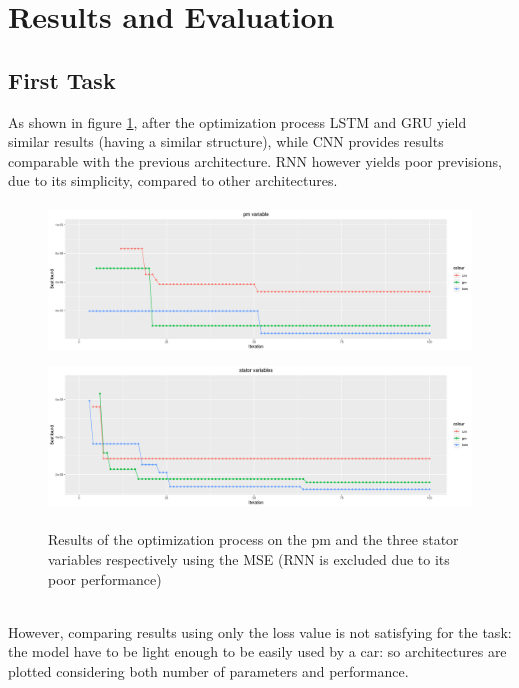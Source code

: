 \section{Results and Evaluation}
 
\subsection{First Task}
As shown in figure \ref{fig:automl_mse}, after the optimization process LSTM and GRU yield similar results (having a similar structure), while CNN provides results comparable with the previous architecture.
RNN however yields poor previsions, due to its simplicity, compared to other architectures.
\begin{figure}[!h]
    \centering
    \includegraphics[width=\linewidth, height=4cm]{imgs/comparison_MSE.png}
    \includegraphics[width=\linewidth, height=4cm]{imgs/comparison_MSE_stator.png}
    \caption{Results of the optimization process on the pm and the three stator variables respectively using the MSE (RNN is excluded due to its poor performance)}
    \label{fig:automl_mse}
\end{figure}\\

However, comparing results using only the loss value is not satisfying for the task: the model have to be light enough to be easily used by a car: so architectures are plotted considering both number of parameters and performance.


